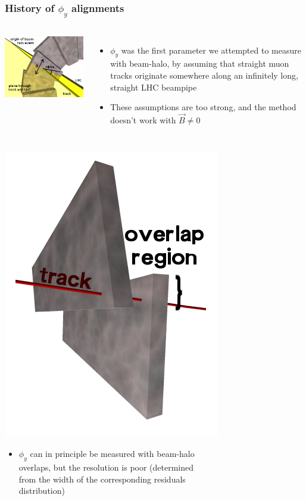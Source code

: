 \documentclass[compress]{beamer}
\begin{document}
\begin{frame}
\frametitle{History of $\phi_y$ alignments}

\vspace{0.1 cm}
\begin{columns}
\includegraphics[width=\linewidth]{track_lhc_plane_closeup.png}

\begin{itemize}
\item $\phi_y$ was the first parameter we attempted to measure with
  beam-halo, by assuming that straight muon tracks originate somewhere
  along an infinitely long, straight LHC beampipe

\item These assumptions are too strong, and the method doesn't work
  with $\vec{B} \ne 0$
\end{itemize}
\end{columns}

\hfill \includegraphics[height=3 cm]{overlaps.png}

\vspace{-3 cm}
\begin{itemize}
\item $\phi_y$ can in principle be measured with beam-halo
  \\ overlaps, but the resolution is poor (determined \\ from the width
  of the corresponding residuals \\ distribution)


\end{itemize}
\end{frame}
\end{document}
